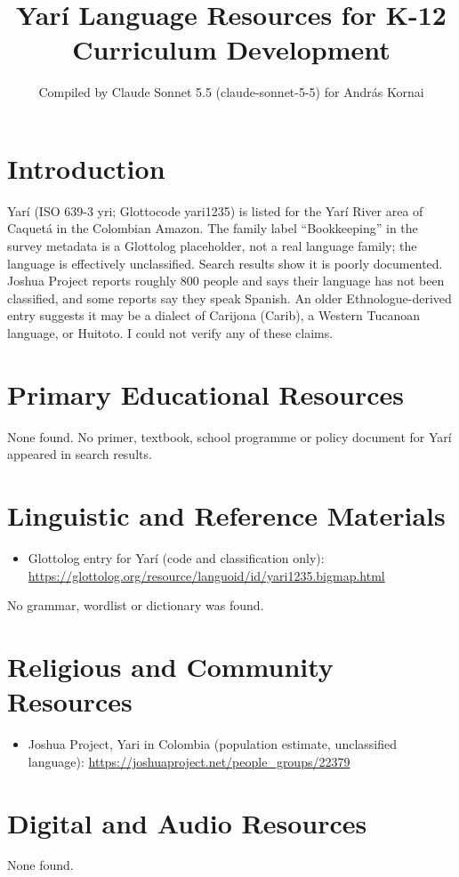 \documentclass[12pt]{article}
\title{Yar\'i Language Resources for K-12 Curriculum Development}
\author{Compiled by Claude Sonnet 5.5 (claude-sonnet-5-5) for Andr\'as Kornai}
\date{}
\begin{document}
\maketitle

\section{Introduction}
Yar\'i (ISO 639-3 yri; Glottocode yari1235) is listed for the Yar\'i River area of Caquet\'a in the Colombian Amazon. The family label ``Bookkeeping'' in the survey metadata is a Glottolog placeholder, not a real language family; the language is effectively unclassified. Search results show it is poorly documented. Joshua Project reports roughly 800 people and says their language has not been classified, and some reports say they speak Spanish. An older Ethnologue-derived entry suggests it may be a dialect of Carijona (Carib), a Western Tucanoan language, or Huitoto. I could not verify any of these claims.

\section{Primary Educational Resources}
None found. No primer, textbook, school programme or policy document for Yar\'i appeared in search results.

\section{Linguistic and Reference Materials}
\begin{itemize}
\item Glottolog entry for Yar\'i (code and classification only): \url{https://glottolog.org/resource/languoid/id/yari1235.bigmap.html}
\end{itemize}
No grammar, wordlist or dictionary was found.

\section{Religious and Community Resources}
\begin{itemize}
\item Joshua Project, Yari in Colombia (population estimate, unclassified language): \url{https://joshuaproject.net/people_groups/22379}
\end{itemize}

\section{Digital and Audio Resources}
None found.
\end{document}
